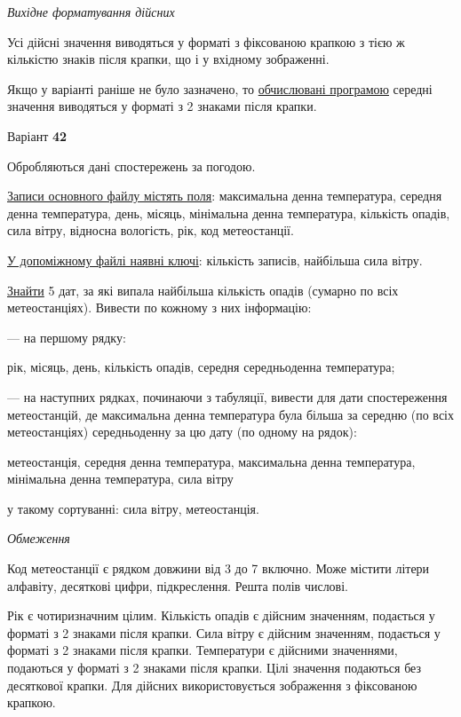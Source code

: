 \documentclass[11pt, ukrainian]{article}
\begin{document}
\textit{Вихідне форматування дійсних}

Усі дійсні значення виводяться у форматі з фіксованою крапкою з тією ж кількістю знаків після крапки, що і у вхідному зображенні.

Якщо у варіанті раніше не було зазначено, то \underline{обчислювані програмою} середні значення виводяться у форматі з 2 знаками після крапки.




\par
\newpage
{\center Варіант  \No \textbf { 42 }\par}
\bigskip
Обробляються дані спостережень за погодою. 

\underline{Записи основного файлу містять поля}: максимальна денна температура, середня денна температура, день, місяць, мінімальна денна температура, кількість опадів, сила вітру, відносна вологість, рік, код метеостанції.

\underline{У допоміжному файлі наявні ключі}: кількість записів, найбільша сила вітру.

\underline{Знайти} 5 дат, за які випала найбільша кількість опадів (сумарно по всіх метеостанціях). Вивести по кожному з них інформацію:\par
{\noindent}--- на першому рядку:\par
рік, місяць, день, кількість опадів, середня середньоденна температура;

{\noindent}--- на наступних рядках, починаючи з табуляції, вивести для дати спостереження метеостанцій, де максимальна денна температура була більша за середню (по всіх метеостанціях) середньоденну за цю дату (по одному на рядок):\par
метеостанція, середня денна температура, максимальна денна температура, мінімальна денна температура, сила вітру

{\noindent}у такому сортуванні: сила вітру, метеостанція.


\bigskip\textit{Обмеження}

Код метеостанції є рядком довжини від 3 до 7 включно.
Може містити літери алфавіту, десяткові цифри, підкреслення. Решта полів числові.

Рік є чотиризначним цілим.
Кількість опадів є дійсним значенням, подається у форматі з 2 знаками після крапки.
Сила вітру є дійсним значенням, подається у форматі з 2 знаками після крапки.
Температури є дійсними значеннями, подаються у форматі з 2 знаками після крапки.
Цілі значення подаються без десяткової крапки.
Для дійсних використовується зображення з фіксованою крапкою.
\end{document}
